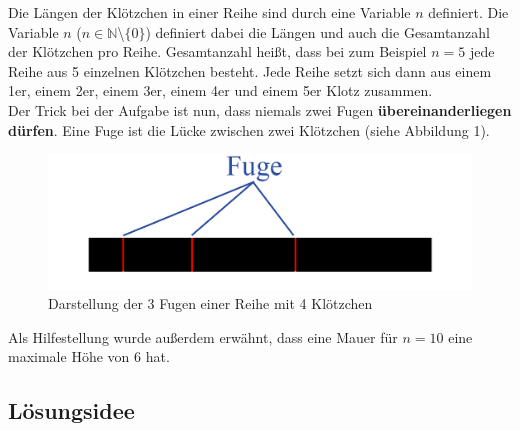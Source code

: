 \documentclass[a4paper,12pt]{article}
\begin{document}
Die Längen der Klötzchen in einer Reihe sind durch eine Variable $n$ definiert.
Die Variable $n$ ($n \in \mathbb{N}$\textbackslash$\{0\}$) definiert dabei die Längen und auch die Gesamtanzahl der Klötzchen pro Reihe.
Gesamtanzahl heißt, dass bei zum Beispiel $n = 5$ jede Reihe aus 5 einzelnen Klötzchen besteht. 
Jede Reihe setzt sich dann aus einem 1er, einem 2er, einem 3er, einem 4er und einem 5er Klotz zusammen.
\\[0.4cm]
Der Trick bei der Aufgabe ist nun, dass niemals zwei Fugen \textbf{übereinanderliegen dürfen}.
Eine Fuge ist die Lücke zwischen zwei Klötzchen (siehe Abbildung 1).
\begin{figure}[H]
    \centering
    \includegraphics[width=0.8\linewidth]{Bilder/Aufgabe1/Definition_Fuge.png}
    \caption{Darstellung der 3 Fugen einer Reihe mit 4 Klötzchen}
\end{figure}

Als Hilfestellung wurde außerdem erwähnt, dass eine Mauer für $n = 10$ eine maximale Höhe von $6$ hat.

\subsection{Lösungsidee}
\end{document}
